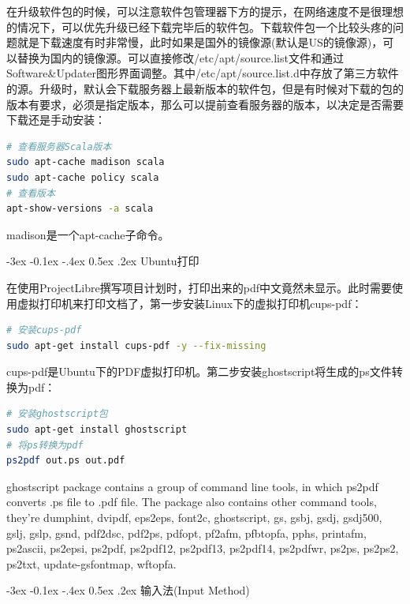 \documentclass[12pt]{book}
\makeatletter
\numberwithin{dummy}{section}
\theoremstyle{ocrenumbox}
\theoremstyle{blacknumex}
\theoremstyle{blacknumbox}
\theoremstyle{ocrenum}
\renewcommand{\subsection}{\@startsection {subsection}{2}{\z@}
	{-3ex \@plus -0.1ex \@minus -.4ex}
	{0.5ex \@plus.2ex }
	{\normalfont\sffamily\bfseries}}
\makeatother
\begin{document}
在升级软件包的时候，可以注意软件包管理器下方的提示，在网络速度不是很理想的情况下，可以优先升级已经下载完毕后的软件包。下载软件包一个比较头疼的问题就是下载速度有时非常慢，此时如果是国外的镜像源(默认是US的镜像源)，可以替换为国内的镜像源。可以直接修改/etc/apt/source.list文件和通过Software\&Updater图形界面调整。其中/etc/apt/source.list.d中存放了第三方软件的源。升级时，默认会下载服务器上最新版本的软件包，但是有时候对下载的包的版本有要求，必须是指定版本，那么可以提前查看服务器的版本，以决定是否需要下载还是手动安装：

\begin{lstlisting}[language=Bash]
# 查看服务器Scala版本
sudo apt-cache madison scala
sudo apt-cache policy scala
# 查看版本
apt-show-versions -a scala
\end{lstlisting}

madison是一个apt-cache子命令。

\subsection{Ubuntu打印}

在使用ProjectLibre撰写项目计划时，打印出来的pdf中文竟然未显示。此时需要使用虚拟打印机来打印文档了，第一步安装Linux下的虚拟打印机cups-pdf：

\begin{lstlisting}[language=Bash]
# 安装cups-pdf
sudo apt-get install cups-pdf -y --fix-missing
\end{lstlisting}

cups-pdf是Ubuntu下的PDF虚拟打印机。第二步安装ghostscript将生成的ps文件转换为pdf：

\begin{lstlisting}[language=Bash]
# 安装ghostscript包
sudo apt-get install ghostscript
# 将ps转换为pdf
ps2pdf out.ps out.pdf
\end{lstlisting}

ghostscript package contains a group of command line tools, in which ps2pdf converts .ps file to .pdf file. The package also contains other command tools, they’re dumphint, dvipdf, eps2eps, font2c, ghostscript, gs, gsbj, gsdj, gsdj500, gslj, gslp, gsnd, pdf2dsc, pdf2ps, pdfopt, pf2afm, pfbtopfa, pphs, printafm, ps2ascii, ps2epsi, ps2pdf, ps2pdf12, ps2pdf13, ps2pdf14, ps2pdfwr, ps2ps, ps2ps2, ps2txt, update-gsfontmap, wftopfa.

\subsection{输入法(Input Method)}
\end{document}
